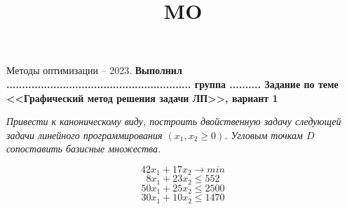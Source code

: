 \documentclass{article}
\title{MO}
\begin{document}
\begin{center}
	Методы оптимизации -- 2023.
	\textbf{Выполнил ........................................................... группа ..........
Задание по теме <<Графический метод решения задачи ЛП>>, вариант 1}
\end{center}

\begin{flushleft}
	\textit{    Привести к каноническому виду, построить двойственную задачу следующей задачи линейного программирования $(x_1,x_2 \geq 0)$. Угловым точкам $D$ сопоставить базисные множества.}
\end{flushleft}

\begin{displaymath}
	42x_1+17x_2 \rightarrow min
\end{displaymath}
\begin{displaymath}
	8x_1+23x_2 \leq552
\end{displaymath}
\begin{displaymath}
	50x_1+25x_2 \leq2500
\end{displaymath}
\begin{displaymath}
	30x_1+10x_2 \leq1470
\end{displaymath}
\vspace{55}
\end{document}
